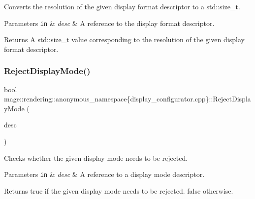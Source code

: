 Converts the resolution of the given display format descriptor to a {\ttfamily std\+::size\+\_\+t}.


\begin{DoxyParams}[1]{Parameters}
\mbox{\tt in}  & {\em desc} & A reference to the display format descriptor. \\
\hline
\end{DoxyParams}
\begin{DoxyReturn}{Returns}
A {\ttfamily std\+::size\+\_\+t} value corresponding to the resolution of the given display format descriptor. 
\end{DoxyReturn}
\mbox{\label{namespacemage_1_1rendering_1_1anonymous__namespace_02display__configurator_8cpp_03_adcb562662bd203427f9c0fe08912e491}} 
\subsubsection{\texorpdfstring{Reject\+Display\+Mode()}{RejectDisplayMode()}}
{\footnotesize\ttfamily bool mage\+::rendering\+::anonymous\+\_\+namespace\{display\+\_\+configurator.\+cpp\}\+::Reject\+Display\+Mode (\begin{DoxyParamCaption}\item[{const D\+X\+G\+I\+\_\+\+M\+O\+D\+E\+\_\+\+D\+E\+SC \&}]{desc }\end{DoxyParamCaption})\hspace{0.3cm}{\ttfamily [noexcept]}}

Checks whether the given display mode needs to be rejected.


\begin{DoxyParams}[1]{Parameters}
\mbox{\tt in}  & {\em desc} & A reference to a display mode descriptor. \\
\hline
\end{DoxyParams}
\begin{DoxyReturn}{Returns}
{\ttfamily true} if the given display mode needs to be rejected. {\ttfamily false} otherwise. 
\end{DoxyReturn}
